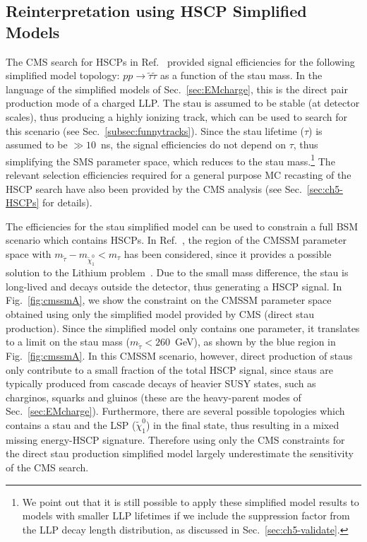 \subsection{Reinterpretation using HSCP Simplified Models}
\label{sec:ch5-smsHSCP}

The CMS search for HSCPs in Ref.~\cite{Khachatryan:2015lla}
provided signal efficiencies for the following simplified model topology:
$ pp \to \tilde{\tau} \tilde{\tau}$ as a function of the
stau mass. In the language of the simplified models of Sec.~\ref{sec:EMcharge},
this is the direct pair production mode of a charged LLP.
 The stau is assumed to be stable (at detector scales), thus
producing a highly ionizing track, which can be used to search
for this scenario (see Sec.~\ref{subsec:funnytracks}). 
Since the stau lifetime ($\tau$) is assumed to be $\gg
10$~ns, the signal efficiencies do not depend on $\tau$,
thus simplifying the SMS parameter space, which reduces to the stau
mass.\footnote{We point out that it is still possible to apply these simplified
model results to models with smaller LLP lifetimes if we include the suppression
factor from the LLP decay length distribution, as
discussed in Sec.~\ref{sec:ch5-validate}.
}
The relevant selection efficiencies required for a general purpose
MC recasting of the HSCP search have also been provided by
the CMS analysis (see Sec.~\ref{sec:ch5-HSCPs} for details).


The efficiencies for the stau simplified model
can be used to constrain a full BSM scenario which contains
HSCPs. In Ref.~\cite{Heisig:2015yla}, the region of the CMSSM parameter
space with $m_{\tilde \tau} - m_{\tilde \chi_1^0} < m_{\tau}$ has been
considered, since it provides a possible solution to the Lithium
problem~\cite{Spite:1982dd, Cyburt:2008kw}. Due to the small
mass difference, the stau is long-lived and decays outside the detector,
thus generating a HSCP signal.
In Fig.~\ref{fig:cmssmA}, we show the constraint on the CMSSM parameter
space obtained using only the simplified model provided by CMS (direct stau
production).
Since the simplified model only contains one parameter, it
translates to a limit on the stau mass ($m_{\tilde \tau} < 260$~GeV),
as shown by the blue region in Fig.~\ref{fig:cmssmA}.
In this CMSSM scenario, however, direct production of staus only contribute to a
small fraction of the total HSCP signal, since staus are typically produced from
cascade decays of heavier SUSY states, such as charginos, squarks and gluinos 
(these are the heavy-parent modes of Sec.~\ref{sec:EMcharge}).
Furthermore, there are several possible topologies which contains a stau and the
LSP ($\tilde \chi_1^0$) in the final state, thus resulting in a
mixed missing energy-HSCP signature.
Therefore using only the CMS constraints for the direct stau production
simplified model largely underestimate the sensitivity of the CMS
search. 


